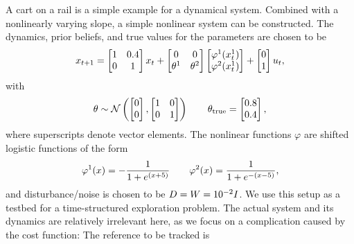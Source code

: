 A cart on a rail is a simple example for a dynamical system. Combined with
a nonlinearly varying slope, a simple nonlinear system can be constructed.
The dynamics, prior beliefs, and true values for the parameters are chosen to be
\begin{equation}
  \label{eq:pendulum-system}
  x_{\tk+1} = \begin{bmatrix} 1 & 0.4 \\ 0 & 1 \end{bmatrix} x_\tk
  + \begin{bmatrix} 0 & 0 \\ \t^1 & \t^2 \end{bmatrix}
  \begin{bmatrix} \varphi^1(x^1_\tk) \\ \varphi^2(x^1_\tk) \end{bmatrix}
  + \begin{bmatrix} 0 \\ 1 \end{bmatrix} u_\tk,
\end{equation}
with
\begin{equation}
  \theta \sim \mathcal{N}\left(\begin{bmatrix} 0 \\ 0 \end{bmatrix},
    \begin{bmatrix}1 & 0 \\ 0 & 1  \end{bmatrix}\right)
  \qquad
  \theta_\text{true} = \begin{bmatrix} 0.8 \\ 0.4 \end{bmatrix},
\end{equation}
where superscripts denote vector elements. The nonlinear functions $\varphi$
are shifted logistic functions of the form
\begin{equation}
  \label{eq:logistic-nonlinearity}
  \varphi^1(x) = -\frac{1}{1+e^{(x+5)}} \qq
  \varphi^2(x) = \frac{1}{1+e^{-(x-5)}},
\end{equation}
and disturbance/noise is chosen to be $D = W = 10^{-2} I$. We use this
setup as a testbed for a time-structured exploration problem. The actual system
and its dynamics are relatively irrelevant here, as we focus on a complication
caused by the cost function: The reference to be tracked is
